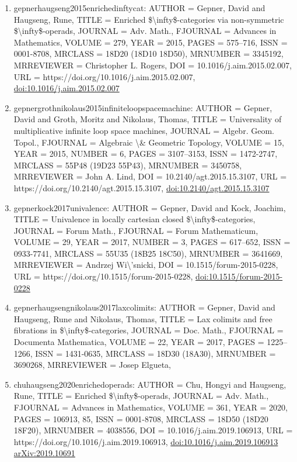 \documentclass[11pt]{article}
\begin{document}
\begin{enumerate}[leftmargin=*]
  \item gepnerhaugseng2015enrichedinftycat: AUTHOR = Gepner, David and Haugseng, Rune, TITLE = Enriched \$\textbackslash{}infty\$-categories via non-symmetric \$\textbackslash{}infty\$-operads, JOURNAL = Adv. Math., FJOURNAL = Advances in Mathematics, VOLUME = 279, YEAR = 2015, PAGES = 575--716, ISSN = 0001-8708, MRCLASS = 18D20 (18D10 18D50), MRNUMBER = 3345192, MRREVIEWER = Christopher L. Rogers, DOI = 10.1016/j.aim.2015.02.007, URL = https://doi.org/10.1016/j.aim.2015.02.007, \href{https://doi.org/10.1016/j.aim.2015.02.007}{doi:10.1016/j.aim.2015.02.007}
  \item gepnergrothnikolaus2015infiniteloopspacemachine: AUTHOR = Gepner, David and Groth, Moritz and Nikolaus, Thomas, TITLE = Universality of multiplicative infinite loop space machines, JOURNAL = Algebr. Geom. Topol., FJOURNAL = Algebraic \textbackslash{}\& Geometric Topology, VOLUME = 15, YEAR = 2015, NUMBER = 6, PAGES = 3107--3153, ISSN = 1472-2747, MRCLASS = 55P48 (19D23 55P43), MRNUMBER = 3450758, MRREVIEWER = John A. Lind, DOI = 10.2140/agt.2015.15.3107, URL = https://doi.org/10.2140/agt.2015.15.3107, \href{https://doi.org/10.2140/agt.2015.15.3107}{doi:10.2140/agt.2015.15.3107}
  \item gepnerkock2017univalence: AUTHOR = Gepner, David and Kock, Joachim, TITLE = Univalence in locally cartesian closed \$\textbackslash{}infty\$-categories, JOURNAL = Forum Math., FJOURNAL = Forum Mathematicum, VOLUME = 29, YEAR = 2017, NUMBER = 3, PAGES = 617--652, ISSN = 0933-7741, MRCLASS = 55U35 (18B25 18C50), MRNUMBER = 3641669, MRREVIEWER = Andrzej Wi\textbackslash{}'snicki, DOI = 10.1515/forum-2015-0228, URL = https://doi.org/10.1515/forum-2015-0228, \href{https://doi.org/10.1515/forum-2015-0228}{doi:10.1515/forum-2015-0228}
  \item gepnerhaugsengnikolaus2017laxcolimits: AUTHOR = Gepner, David and Haugseng, Rune and Nikolaus, Thomas, TITLE = Lax colimits and free fibrations in \$\textbackslash{}infty\$-categories, JOURNAL = Doc. Math., FJOURNAL = Documenta Mathematica, VOLUME = 22, YEAR = 2017, PAGES = 1225--1266, ISSN = 1431-0635, MRCLASS = 18D30 (18A30), MRNUMBER = 3690268, MRREVIEWER = Josep Elgueta,
  \item chuhaugseng2020enrichedoperads: AUTHOR = Chu, Hongyi and Haugseng, Rune, TITLE = Enriched \$\textbackslash{}infty\$-operads, JOURNAL = Adv. Math., FJOURNAL = Advances in Mathematics, VOLUME = 361, YEAR = 2020, PAGES = 106913, 85, ISSN = 0001-8708, MRCLASS = 18D50 (18D20 18F20), MRNUMBER = 4038556, DOI = 10.1016/j.aim.2019.106913, URL = https://doi.org/10.1016/j.aim.2019.106913, \href{https://doi.org/10.1016/j.aim.2019.106913}{doi:10.1016/j.aim.2019.106913} \href{https://arxiv.org/abs/2019.10691}{arXiv:2019.10691}

\end{enumerate}
\end{document}
